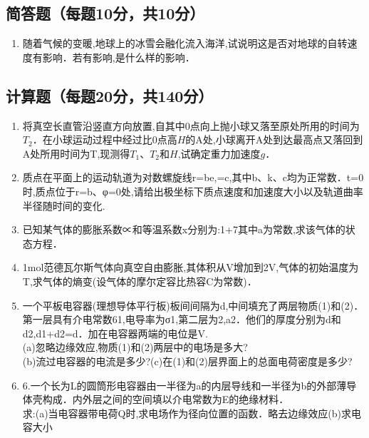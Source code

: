 
\subsection{简答题（每题10分，共10分）}
\begin{enumerate}
\item 随着气候的变暖,地球上的冰雪会融化流入海洋,试说明这是否对地球的自转速度有影响．若有影响,是什么样的影响．
\end{enumerate}
\subsection{计算题（每题20分，共140分）}
\begin{enumerate}
\item 将真空长直管沿竖直方向放置,自其中0点向上抛小球又落至原处所用的时间为$T_2$．在小球运动过程中经过比0点高$H$的$\mathrm A$处,小球离开$\mathrm A$处到达最高点又落回到$\mathrm A$处所用时间为T,现测得$T_1$、$T_2$和$H$,试确定重力加速度$g$．
\item 质点在平面上的运动轨道为对数螺旋线r=be,=c,其中b、k、c均为正常数．t=0时,质点位于r=b、φ=0处,请给出极坐标下质点速度和加速度大小以及轨道曲率半径随时间的变化.
\item 已知某气体的膨胀系数∝和等温系数x分别为:1+7其中a为常数,求该气体的状态方程．
\item 1mol范德瓦尔斯气体向真空自由膨胀,其体积从V增加到2V,气体的初始温度为T,求气体的熵变(设气体的摩尔定容比热容C为常数)．
\item 一个平板电容器(理想导体平行板)板间间隔为d,中间填充了两层物质(1)和(2)．第一层具有介电常数61,电导率为σ1,第二层为2,a2．他们的厚度分别为d和d2,d1+d2=d．加在电容器两端的电位是V.\\
(a)忽略边缘效应,物质(1)和(2)两层中的电场是多大?\\
(b)流过电容器的电流是多少?(c)在(1)和(2)层界面上的总面电荷密度是多少?
\item 6.一个长为L的圆筒形电容器由一半径为a的内层导线和一半径为b的外部薄导体壳构成．内外层之间的空间填以介电常数为E的绝缘材料．\\
求:(a)当电容器带电荷Q时,求电场作为径向位置的函数．略去边缘效应(b)求电容大小

\end{enumerate}